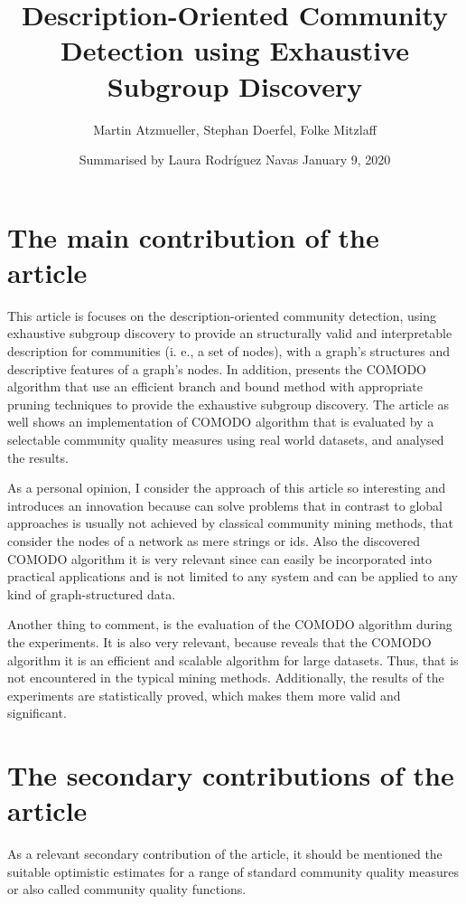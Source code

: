 \documentclass[a4paper]{article}
\title{Description-Oriented Community Detection using Exhaustive Subgroup Discovery}
\date{Summarised by Laura Rodríguez Navas \vskip 0.35cm January 9, 2020}
\author{Martin Atzmueller, Stephan Doerfel, Folke Mitzlaff}
\begin{document}
	
\maketitle

\section*{The main contribution of the article}
This article is focuses on the description-oriented community detection, using exhaustive subgroup discovery to provide an structurally valid and interpretable description for communities (i. e., a set of nodes), with a graph's structures and descriptive features of a graph’s nodes. In addition, presents the COMODO algorithm that use an efficient branch and bound method with appropriate pruning techniques to provide the exhaustive subgroup discovery. The article as well shows an implementation of COMODO algorithm that is evaluated by a selectable community quality measures using real world datasets, and analysed the results.
\vskip 0.35cm

As a personal opinion, I consider the approach of this article so interesting and introduces an innovation because can solve problems that in contrast to global approaches is usually not achieved by classical community mining methods, that consider the nodes of a network as mere strings or ids. Also the discovered COMODO algorithm it is very relevant since can easily be incorporated into practical applications and is not limited to any system and can be applied to any kind of graph-structured data.
\vskip 0.35cm

Another thing to comment, is the evaluation of the COMODO algorithm during the experiments. It is also very relevant, because reveals that the COMODO algorithm it is an efficient and scalable algorithm for large datasets. Thus, that is not encountered in the typical mining methods. Additionally, the results of the experiments are statistically proved, which makes them more valid and significant.

\section*{The secondary contributions of the article}
As a relevant secondary contribution of the article, it should be mentioned the suitable optimistic estimates for a range of standard community quality measures or also called community quality functions.

\newpage
\end{document}
